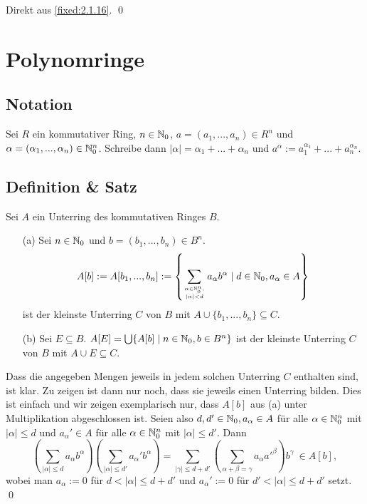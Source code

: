 \proof Direkt aus \ref{fixed:2.1.16}. \qed
 
\section{Polynomringe \small{}}

\subsection{Notation} Sei $R$ ein kommutativer Ring, $n \in \mathbb N_0$, $a=(a_1,...,a_n)\in R^n$ und $\alpha=(\alpha_1,...,\alpha_n) \in \mathbb N_0^n$. Schreibe dann $|\alpha|=\alpha_1+...+\alpha_n$ und $a^\alpha:=a_1^{\alpha_1}+...+a_n^{\alpha_n}$.

\subsection{Definition \& Satz} Sei $A$ ein Unterring des kommutativen Ringes $B$.
\begin{itemize}
	\item[(a)]
		Sei $n \in \mathbb N_0$ und $b=(b_1,...,b_n)\in B^n$.
		\begin{equation*}
			 A[b] := A[b_1,...,b_n]
			 :=\left\{\sum_{\alpha \in \mathbb N_0^n, \atop |\alpha|<d} a_\alpha b^\alpha \mid d \in \mathbb N_0, a_\alpha\in A\right\}
		\end{equation*}
		ist der kleinste Unterring $C$ von $B$ mit $A \cup \{b_1,...,b_n\} \subseteq C$.
   
	\item[(b)]
		Sei $E \subseteq B$. $A[E] = \bigcup\{A[b] \mid n\in \mathbb N_0, b\in B^n\}$ ist der kleinste Unterring $C$ von $B$ mit $A \cup E \subseteq C$.
\end{itemize}

\proof Dass die angegeben Mengen jeweils in jedem solchen Unterring $C$ enthalten sind, ist klar. Zu zeigen ist dann nur noch, dass sie jeweils einen Unterring bilden. Dies ist einfach und wir zeigen exemplarisch nur, dass $A[b]$ aus (a) unter Multiplikation abgeschlossen ist. Seien also $d, d' \in \mathbb N_0, a_\alpha \in A$ für alle $\alpha \in \mathbb N_0^n$ mit $|\alpha| \leq d$ und $a_\alpha' \in A$ für alle $\alpha \in \mathbb N_0^n$ mit $|\alpha| \leq d'$. Dann
\begin{equation*}
	\left(\sum_{|\alpha| \leq d} a_\alpha b^\alpha\right)\left(\sum_{|\alpha| \leq d'} a_\alpha' b^\alpha\right)
	= \sum_{|\gamma| \leq d+d'} \left(\sum_{\alpha+\beta=\gamma} a_\alpha a'^\beta\right) b^\gamma~\in A[b],
\end{equation*}
wobei man $a_\alpha:=0$ für $d<|\alpha| \leq d+d'$ und $a_\alpha':=0$ für $d'<|\alpha| \leq d+d'$ setzt. \qed
